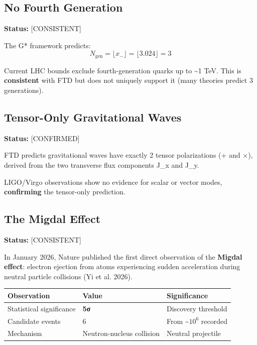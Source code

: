\documentclass[
  11pt,
  letterpaper,
  twoside,
  openany]{book}
\makeatletter
\let\orig@subsection\subsection
\renewcommand{\subsection}{\needspace{6\baselineskip}\orig@subsection}
\makeatother
\begin{document}
\subsection{No Fourth Generation}\label{no-fourth-generation}

\textbf{Status:} {[}CONSISTENT{]}

The G* framework predicts:
\[N_{\text{gen}} = \lfloor x_- \rfloor = \lfloor 3.024 \rfloor = 3\]

Current LHC bounds exclude fourth-generation quarks up to
\textasciitilde1 TeV. This is \textbf{consistent} with FTD but does not
uniquely support it (many theories predict 3 generations).

\subsection{Tensor-Only Gravitational
Waves}\label{tensor-only-gravitational-waves}

\textbf{Status:} {[}CONFIRMED{]}

FTD predicts gravitational waves have exactly 2 tensor polarizations (+
and ×), derived from the two transverse flux components J\_x and J\_y.

LIGO/Virgo observations show no evidence for scalar or vector modes,
\textbf{confirming} the tensor-only prediction.

\subsection{The Migdal Effect}\label{the-migdal-effect}

\textbf{Status:} {[}CONSISTENT{]}

In January 2026, Nature published the first direct observation of the
\textbf{Migdal effect}: electron ejection from atoms experiencing sudden
acceleration during neutral particle collisions (Yi et al. 2026).

\begin{longtable}[]{@{}lll@{}}
\toprule\noalign{}
Observation & Value & Significance \\
\midrule\noalign{}
\endhead
\bottomrule\noalign{}
\endlastfoot
Statistical significance & \textbf{5σ} & Discovery threshold \\
Candidate events & 6 & From \textasciitilde{}\(10^6\) recorded \\
Mechanism & Neutron-nucleus collision & Neutral projectile \\
\end{longtable}
\end{document}
